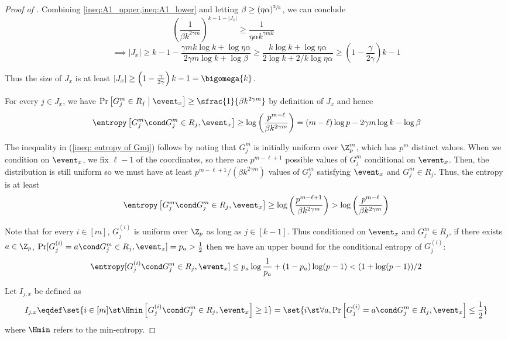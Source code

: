 \begin{proof}[Proof of ]
		Combining \cref{ineq:A1_upper,ineq:A1_lower} 
and letting $\beta\ge (\eta\alpha)^{\sfrac{2}{k}}$, we can conclude
%
\[\left( \frac{1}{\beta k^{2\gamma m}} \right)^{k-1-|J_x|}\ge  \frac{1}{\eta\alpha k^{\gamma mk}} \qquad\qquad\qquad\qquad \]
\[ \implies |J_x|\ge k-1-\frac{\gamma mk\log k+ \log \eta\alpha}{2\gamma m\log k + \log \beta} \ge \frac{k \log k + \log \eta \alpha}{2 \log k + 2/k  \log \eta \alpha} \ge \left(1-\frac{\gamma}{2\gamma}\right)k-1\]

		Thus the size of $J_x$ is at least
		 $|J_x|\ge \left(1-\frac{\gamma}{2\gamma}\right)k-1=\bigomega{k}$.

		For every $j\in J_x$, we have $\Pr\left[G^m_j\in R_j\; \big| \; \event_x\right] \ge \sfrac{1}{\beta k^{2\gamma m}}$ by definition of $J_x$
		and hence 
		\begin{align}\label{ineq: entropy of Gmj}
		\entropy\left[ G^m_j \cond G^m_j\in R_j,\event_x \right] \ge \log\left( \frac{p^{m-\ell}}{\beta k^{2\gamma m}} \right)=(m-\ell)\log p - 2\gamma m\log k - \log \beta
		\end{align}
		
		{\color{black}The inequality in (\ref{ineq: entropy of Gmj}) follows by noting that $G^m_j$ is initially uniform over $\Z_p^m$, which has $p^m$ distinct values. When we condition on $\event_x$, we fix $\ell-1$ of the coordinates, so there are $p^{m-\ell+1}$ possible values of $G^m_j$ conditional on $\event_x$. Then, the distribution is still uniform so we must have at least $p^{m-\ell+1}/\left(\beta k^{2\gamma m}\right)$
		values of $G_j^m$ satisfying $\event_x$ and $G_j^m \in R_j$. Thus, the entropy is at least
		$$\entropy\left[ G^m_j \cond G^m_j\in R_j,\event_x \right] \ge \log\left( \frac{p^{m-\ell+1}}{\beta k^{2\gamma m}} \right) > \log\left( \frac{p^{m-\ell}}{\beta k^{2\gamma m}} \right)$$} 

		Note that for every $i\in[m]$, $G_j^{(i)}$ is uniform over $\Z_p$ as long as $j\in [k-1]$.
		Thus conditioned on $\event_x$ and $G_j^m\in R_j$,
		if there exists $a\in\Z_p$, 
		$\Pr[G_j^{(i)}=a \cond G_j^m\in R_j,\event_x ]=p_a>\frac{1}{2}$ 
		then we have an upper bound for the conditional entropy of $G_j^{(i)} $: 
		\begin{align*}%
			\entropy[G_j^{(i)}\cond G_j^m\in R_j,\event_x ]\le p_a\log\frac{1}{p_a}+(1-p_a)\log(p-1)< (1+\log(p-1))/2
		\end{align*}

		Let $I_{j,x}$ be defined as 
		\[I_{j,x}\eqdef\set{i\in [m] \st \Hmin\left[ G_j^{(i)}\cond G_j^m\in R_j,\event_x  \right]\ge 1 } = \set{i \st \forall a, \Pr\left[ G_j^{(i)}=a\cond G_j^m\in R_j,\event_x  \right]\le \frac{1}{2} }\]
		{\color{black}where $\Hmin$ refers to the min-entropy.} %
		

\end{proof}
